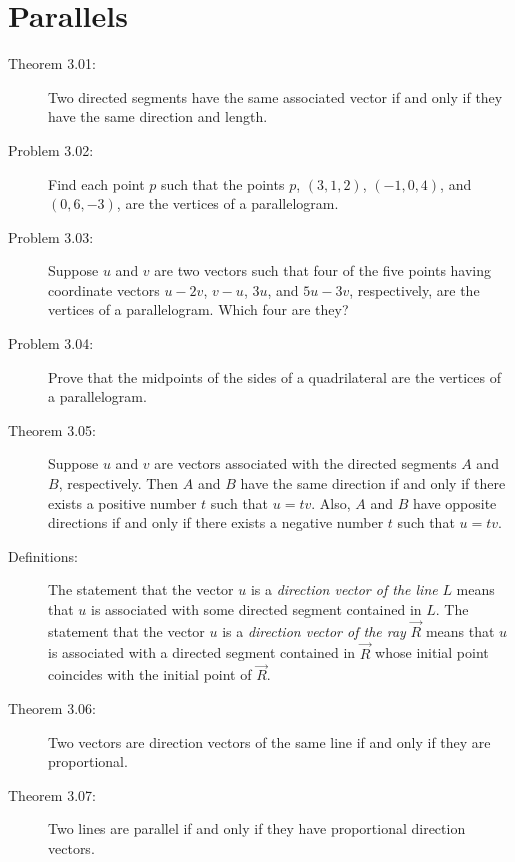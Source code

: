 \documentclass{article}
\begin{document}
\begin{description}
\end{description}


\section{Parallels}

\begin{description}

  \item[Theorem 3.01:] Two directed segments have the same associated vector if and only if they have the same direction and length.

  \item[Problem 3.02:] Find each point $p$ such that the points $p$, $(3,1,2)$, $(-1,0,4)$, and $(0,6,-3)$, are the vertices of a parallelogram.

  \item[Problem 3.03:] Suppose $u$ and $v$ are two vectors such that four of the five points having coordinate vectors $u-2v$, $v-u$, $3u$, and $5u-3v$, respectively, are the vertices of a parallelogram. Which four are they?

  \item[Problem 3.04:] Prove that the midpoints of the sides of a quadrilateral are the vertices of a parallelogram.

  \item[Theorem 3.05:] Suppose $u$ and $v$ are vectors associated with the directed segments $A$ and $B$, respectively. Then $A$ and $B$ have the same direction if and only if there exists a positive number $t$ such that $u=tv$. Also, $A$ and $B$ have opposite directions if and only if there exists a negative number $t$ such that $u = tv$.

  \item[Definitions:] The statement that the vector $u$ is a \emph{direction vector of the line} $L$ means that $u$ is associated with some directed segment contained in $L$. The statement that the vector $u$ is a \emph{direction vector of the ray} $\overrightarrow{R}$ means that $u$ is associated with a directed segment contained in $\overrightarrow{R}$ whose initial point coincides with the initial point of $\overrightarrow{R}$.

  \item[Theorem 3.06:] Two vectors are direction vectors of the same line if and only if they are proportional.

  \item[Theorem 3.07:] Two lines are parallel if and only if they have proportional direction vectors.


\end{description}
\end{document}
